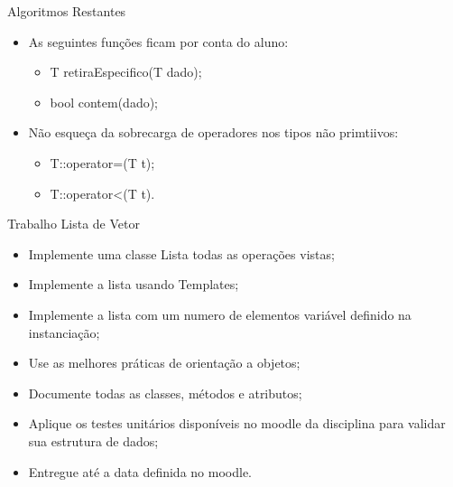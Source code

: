\documentclass[12pt,table,xcolor={dvipsnames}]{beamer}
\begin{document}
\begin{frame}[fragile]{Algoritmos Restantes}
\begin{itemize}
\item As seguintes funções ficam por conta do aluno:
\begin{itemize}
\item T retiraEspecifico(T dado);
\item bool contem(dado);
\end{itemize}
\item Não esqueça da sobrecarga de operadores nos tipos não primtiivos:
\begin{itemize}
\item  T::operator=(T t);
\item  T::operator<(T t).
\end{itemize}

\end{itemize}
\end{frame}


\begin{frame}[fragile]{Trabalho Lista de Vetor}
\begin{itemize}
\item Implemente uma classe Lista todas as operações vistas;
\item Implemente a lista usando Templates;
\item Implemente a lista com um numero de elementos variável definido na instanciação;
\item Use as melhores práticas de orientação a objetos;
\item Documente todas as classes, métodos e atributos;
\item Aplique os testes unitários disponíveis no moodle da disciplina para validar sua estrutura de dados;
\item Entregue até a data definida no moodle.
\end{itemize}
\end{frame}
\end{document}
